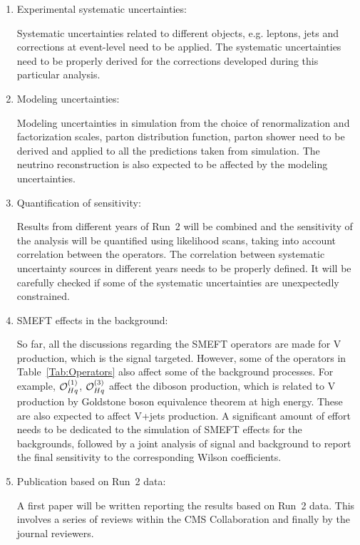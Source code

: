 \documentclass[a4paper,11pt]{article}
\renewcommand{\PV}{{{{V}}}\xspace}
\newcommand{\VH}{{{\PV}{\PH}}\xspace}
\begin{document}
\begin{enumerate}
\item Experimental systematic uncertainties: 

Systematic uncertainties related to different objects, e.g. leptons, jets and corrections at event-level need to be applied. The systematic uncertainties need to be properly derived for the corrections developed during this particular analysis. 

\item Modeling uncertainties: 

Modeling uncertainties in simulation from the choice of renormalization and factorization scales, parton distribution function, parton shower need to be derived and applied to all the predictions taken from simulation. 
The neutrino reconstruction is also expected to be affected by the modeling uncertainties. 

\item Quantification of sensitivity: 

Results from different years of Run~2 will be combined and
the sensitivity of the analysis will be quantified using likelihood scans, taking into account correlation between the operators. 
The correlation between systematic uncertainty sources in different years needs to be properly defined. 
It will be carefully checked if some of the systematic uncertainties are unexpectedly constrained. 

\item SMEFT effects in the background:

So far, all the discussions regarding the SMEFT operators are made for \VH production, which is the signal targeted. However, some of the operators in Table~\ref{Tab:Operators} also affect some of the background processes. 
For example, ${\cal O}^{(1)}_{Hq}$, ${\cal O}^{(3)}_{Hq}$ affect the diboson production, which is related to \VH production by Goldstone boson equivalence theorem at high energy. 
These are also expected to affect {\PV}+jets production. 
A significant amount of effort needs to be dedicated to the simulation of SMEFT effects for the backgrounds, followed by a joint analysis of signal and background to report the final sensitivity to the corresponding Wilson coefficients. 

\item Publication based on Run~2 data:

A first paper will be written reporting the results based on Run~2 data. This involves a series of reviews within the CMS Collaboration and finally by the journal reviewers. 


\end{enumerate}
\end{document}

